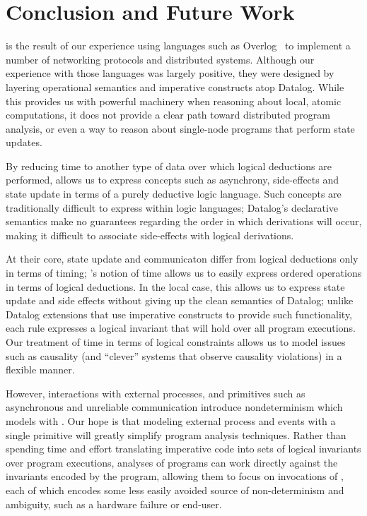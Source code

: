 \section{Conclusion and Future Work}
\lang is the result of our experience using languages such as
Overlog~\cite{overlog} to implement a number of networking protocols
and distributed systems.  Although our experience with those
languages was largely positive, they were designed by layering
operational semantics and imperative constructs atop Datalog.  While
this provides us with powerful machinery when reasoning about local,
atomic computations, it does not provide a clear
path toward distributed program analysis, or even a way to reason
about single-node programs that perform state updates.

By reducing time to another type of data over which logical deductions
are performed, \lang allows us to express concepts such as asynchrony,
side-effects and state update in terms of a purely deductive logic
language.  Such concepts are traditionally difficult to express within
logic languages; Datalog's declarative semantics make no guarantees
regarding the order in which derivations will occur, making it
difficult to associate side-effects with logical derivations.  

At their core, state update and communicaton differ from logical
deductions only in terms of timing; \lang's notion of time allows us
to easily express ordered operations in terms of logical deductions.
In the local case, this allows us to express state update and side
effects without giving up the clean semantics of Datalog; unlike
Datalog extensions that use imperative constructs to provide such
functionality, each \lang rule expresses a logical invariant that will
hold over all program executions.  Our treatment of time in terms of
logical constraints allows us to model issues such as causality (and
``clever'' systems that observe causality violations) in a flexible
manner.

However, interactions with external processes, and primitives such as
asynchronous and unreliable communication introduce nondeterminism
which \lang models with .  
Our hope is that modeling external process and events with a single
primitive will greatly simplify program analysis techniques.  Rather
than spending time and effort translating imperative code into sets of logical
invariants over program executions, analyses of \lang programs can
work directly against the invariants encoded by the program, allowing
them to focus on invocations of , each of which
encodes some less easily avoided source of non-determinism and
ambiguity, such as a hardware failure or end-user.

